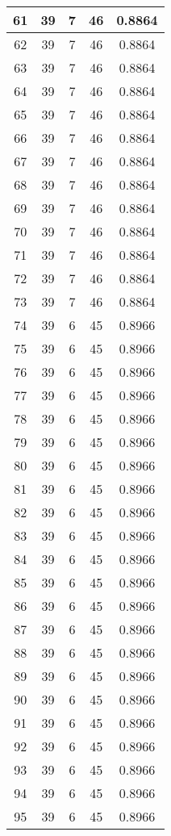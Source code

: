 \documentclass[letterpaper, 12pt]{article}
\begin{document}
\begin{longtable}{|c|c|c|c|c|}
\hline
61 & 39 & 7 & 46 & 0.8864 \\
\hline
62 & 39 & 7 & 46 & 0.8864 \\
\hline
63 & 39 & 7 & 46 & 0.8864 \\
\hline
64 & 39 & 7 & 46 & 0.8864 \\
\hline
65 & 39 & 7 & 46 & 0.8864 \\
\hline
66 & 39 & 7 & 46 & 0.8864 \\
\hline
67 & 39 & 7 & 46 & 0.8864 \\
\hline
68 & 39 & 7 & 46 & 0.8864 \\
\hline
69 & 39 & 7 & 46 & 0.8864 \\
\hline
70 & 39 & 7 & 46 & 0.8864 \\
\hline
71 & 39 & 7 & 46 & 0.8864 \\
\hline
72 & 39 & 7 & 46 & 0.8864 \\
\hline
73 & 39 & 7 & 46 & 0.8864 \\
\hline
74 & 39 & 6 & 45 & 0.8966 \\
\hline
75 & 39 & 6 & 45 & 0.8966 \\
\hline
76 & 39 & 6 & 45 & 0.8966 \\
\hline
77 & 39 & 6 & 45 & 0.8966 \\
\hline
78 & 39 & 6 & 45 & 0.8966 \\
\hline
79 & 39 & 6 & 45 & 0.8966 \\
\hline
80 & 39 & 6 & 45 & 0.8966 \\
\hline
81 & 39 & 6 & 45 & 0.8966 \\
\hline
82 & 39 & 6 & 45 & 0.8966 \\
\hline
83 & 39 & 6 & 45 & 0.8966 \\
\hline
84 & 39 & 6 & 45 & 0.8966 \\
\hline
85 & 39 & 6 & 45 & 0.8966 \\
\hline
86 & 39 & 6 & 45 & 0.8966 \\
\hline
87 & 39 & 6 & 45 & 0.8966 \\
\hline
88 & 39 & 6 & 45 & 0.8966 \\
\hline
89 & 39 & 6 & 45 & 0.8966 \\
\hline
90 & 39 & 6 & 45 & 0.8966 \\
\hline
91 & 39 & 6 & 45 & 0.8966 \\
\hline
92 & 39 & 6 & 45 & 0.8966 \\
\hline
93 & 39 & 6 & 45 & 0.8966 \\
\hline
94 & 39 & 6 & 45 & 0.8966 \\
\hline
95 & 39 & 6 & 45 & 0.8966 \\

\end{longtable}
\end{document}
